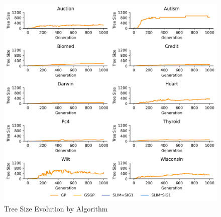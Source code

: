 
    \begin{figure}[H]
    \centering
    \includegraphics[width=\linewidth]{../Latex/Chapters/Figures/Results/final_comparison_tree_size_evolution.png}
    \caption{Tree Size Evolution by Algorithm}
    \label{fig:final_comparison_tree_size_evolution}
    \end{figure}
    